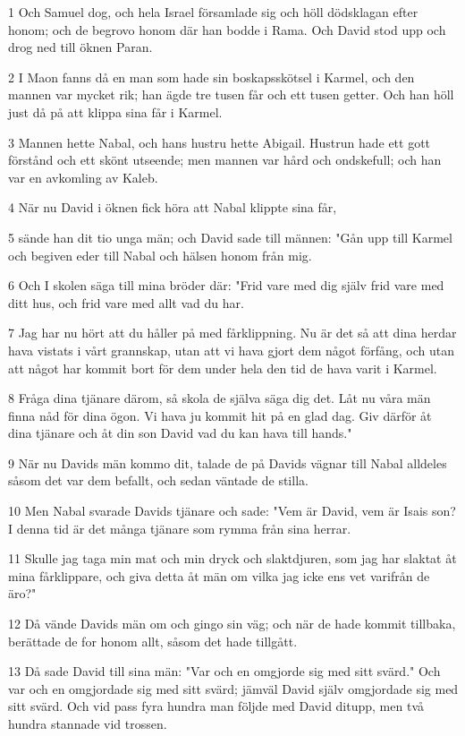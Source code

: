 \par 1 Och Samuel dog, och hela Israel församlade sig och höll dödsklagan efter honom; och de begrovo honom där han bodde i Rama. Och David stod upp och drog ned till öknen Paran.
\par 2 I Maon fanns då en man som hade sin boskapsskötsel i Karmel, och den mannen var mycket rik; han ägde tre tusen får och ett tusen getter. Och han höll just då på att klippa sina får i Karmel.
\par 3 Mannen hette Nabal, och hans hustru hette Abigail. Hustrun hade ett gott förstånd och ett skönt utseende; men mannen var hård och ondskefull; och han var en avkomling av Kaleb.
\par 4 När nu David i öknen fick höra att Nabal klippte sina får,
\par 5 sände han dit tio unga män; och David sade till männen: "Gån upp till Karmel och begiven eder till Nabal och hälsen honom från mig.
\par 6 Och I skolen säga till mina bröder där: "Frid vare med dig själv frid vare med ditt hus, och frid vare med allt vad du har.
\par 7 Jag har nu hört att du håller på med fårklippning. Nu är det så att dina herdar hava vistats i vårt grannskap, utan att vi hava gjort dem något förfång, och utan att något har kommit bort för dem under hela den tid de hava varit i Karmel.
\par 8 Fråga dina tjänare därom, så skola de själva säga dig det. Låt nu våra män finna nåd för dina ögon. Vi hava ju kommit hit på en glad dag. Giv därför åt dina tjänare och åt din son David vad du kan hava till hands."
\par 9 När nu Davids män kommo dit, talade de på Davids vägnar till Nabal alldeles såsom det var dem befallt, och sedan väntade de stilla.
\par 10 Men Nabal svarade Davids tjänare och sade: "Vem är David, vem är Isais son? I denna tid är det många tjänare som rymma från sina herrar.
\par 11 Skulle jag taga min mat och min dryck och slaktdjuren, som jag har slaktat åt mina fårklippare, och giva detta åt män om vilka jag icke ens vet varifrån de äro?"
\par 12 Då vände Davids män om och gingo sin väg; och när de hade kommit tillbaka, berättade de for honom allt, såsom det hade tillgått.
\par 13 Då sade David till sina män: "Var och en omgjorde sig med sitt svärd." Och var och en omgjordade sig med sitt svärd; jämväl David själv omgjordade sig med sitt svärd. Och vid pass fyra hundra man följde med David ditupp, men två hundra stannade vid trossen.
